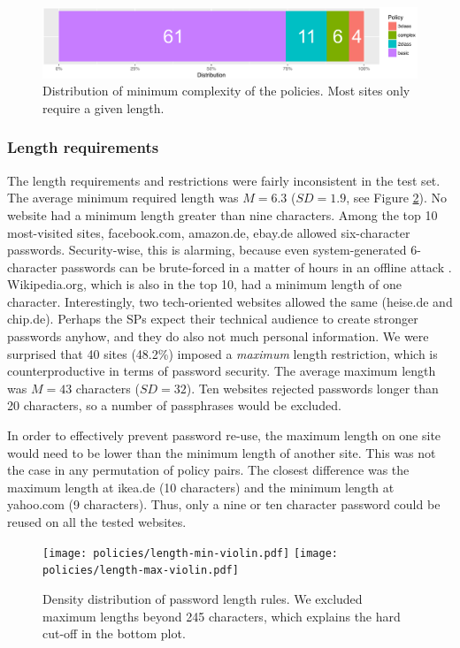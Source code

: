 \begin{figure}[tbph]
	\centering
	\includegraphics[width=\linewidth]{figures/policies/policies-distribution-edited-v2}
	\caption{\label{fig:policies_reuse:policies-distribution-edited}Distribution of minimum complexity of the policies. Most sites only require a given length.}
\end{figure}

\subsubsection{Length requirements} 
The length requirements and restrictions were fairly inconsistent in the test set. The average minimum required length was $M=6.3$ ($SD=1.9$, see Figure \ref{fig:policies_reuse:min-max-length}). No website had a minimum length greater than nine characters. Among the top 10 most-visited sites, facebook.com, amazon.de, ebay.de allowed six-character passwords. Security-wise, this is alarming, because even system-generated 6-character passwords can be brute-forced in a matter of hours in an offline attack . Wikipedia.org, which is also in the top 10, had a minimum length of one character. Interestingly, two tech-oriented websites allowed the same (heise.de and chip.de). Perhaps the \glspl{SP} expect their technical audience to create stronger passwords anyhow, and they do also not much personal information. 
We were surprised that 40 sites (48.2\%) imposed a \textit{maximum} length restriction, which is counterproductive in terms of password security. The average maximum length was $M=43$ characters ($SD=32$). Ten websites rejected passwords longer than 20 characters, so a number of passphrases would be excluded. 

In order to effectively prevent password re-use, the maximum length on one site would need to be lower than the minimum length of another site. This was not the case in any permutation of policy pairs. The closest difference was the maximum length at ikea.de (10 characters) and the minimum length at yahoo.com (9 characters). Thus, only a nine or ten character password could be reused on all the tested websites. 
\begin{figure}[tbph]
	\centering
	\texttt{[image: policies/length-min-violin.pdf]}
	\texttt{[image: policies/length-max-violin.pdf]}
	\caption{\label{fig:policies_reuse:min-max-length}Density distribution of password length rules. We excluded maximum lengths beyond 245 characters, which explains the hard cut-off in the bottom plot.}
\end{figure}

